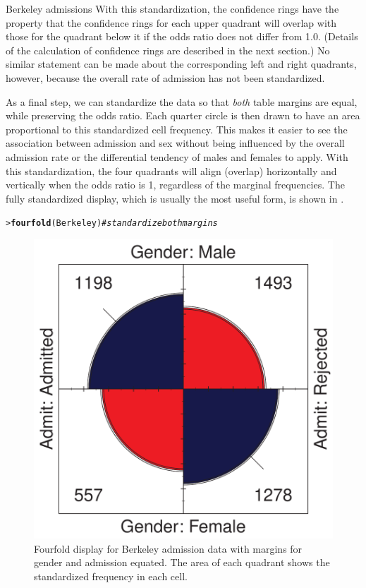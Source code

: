 \documentclass[10pt,krantz2]{krantz}\usepackage[]{graphicx}\usepackage[]{color}
\makeatletter
\newcommand{\hlcom}[1]{\textcolor[rgb]{0.678,0.584,0.686}{\textit{#1}}}%
\newcommand{\hlstd}[1]{\textcolor[rgb]{0.345,0.345,0.345}{#1}}%
\newcommand{\hlkwd}[1]{\textcolor[rgb]{0.737,0.353,0.396}{\textbf{#1}}}%
\newenvironment{kframe}{%
 \def\at@end@of@kframe{}%
 \ifinner\ifhmode%
  \def\at@end@of@kframe{\end{minipage}}%
  \begin{minipage}{\columnwidth}%
 \fi\fi%
 \def\FrameCommand##1{\hskip\@totalleftmargin \hskip-\fboxsep
 \colorbox{shadecolor}{##1}\hskip-\fboxsep
     \hskip-\linewidth \hskip-\@totalleftmargin \hskip\columnwidth}%
 \MakeFramed {\advance\hsize-\width
   \@totalleftmargin\z@ \linewidth\hsize
   \@setminipage}}%
 {\par\unskip\endMakeFramed%
 \at@end@of@kframe}
\newenvironment{knitrout}{}{} %
\renewenvironment{knitrout}{\small\renewcommand{\baselinestretch}{.85}}{} %
\makeatother
\begin{document}
\begin{Example}[berkeley2]{Berkeley admissions}
With this standardization, the confidence rings have the property
that the confidence rings for each upper quadrant will overlap
with those for the quadrant below it if the
odds ratio does not differ from 1.0.
(Details of the calculation of confidence rings are described
in the next section.)
No similar statement can be made about the
corresponding left and right quadrants, however, because
the overall rate of admission has not been standardized.

As a final step, we can standardize the data so that \emph{both} table margins
are equal, while preserving the odds ratio.
Each quarter circle is then drawn to have an area
proportional to this standardized cell frequency.  This makes it
easier to see the association between admission and sex without being
influenced by the overall admission rate or the differential tendency
of males and females to apply.  With this standardization, the four
quadrants will align (overlap) horizontally and vertically
when the odds ratio is 1, regardless of the
marginal frequencies.  The fully standardized display, which is
usually the most useful form, is shown in .

\begin{knitrout}
\color{fgcolor}\begin{kframe}
\begin{alltt}
\hlstd{> }\hlkwd{fourfold}\hlstd{(Berkeley)}  \hlcom{# standardize both margins}
\end{alltt}
\end{kframe}\begin{figure}[!htbp]

\centerline{\includegraphics[width=.6\textwidth]{ch04/fig/berk-fourfold3-1} }

\caption[Fourfold display for Berkeley admission data with margins for gender and admission equated]{Fourfold display for Berkeley admission data with margins for gender and admission equated. The area of each quadrant shows the standardized frequency in each cell.}\label{fig:berk-fourfold3}
\end{figure}


\end{knitrout}

\end{Example}
\end{document}
